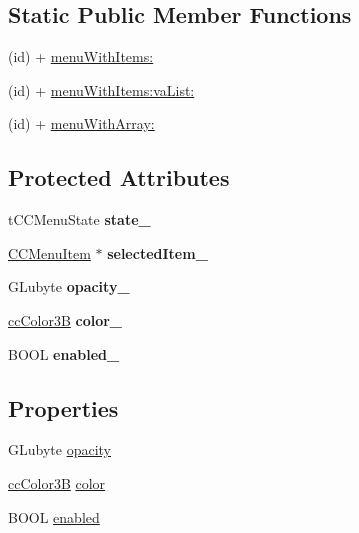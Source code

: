 \subsection*{Static Public Member Functions}
\begin{DoxyCompactItemize}
\item 
(id) + \hyperlink{interface_c_c_menu_aefcb167ba03050c94e2e31c4faa2e6cf}{menu\-With\-Items\-:}
\item 
(id) + \hyperlink{interface_c_c_menu_a06d3ce20a8986202652696d0d134256c}{menu\-With\-Items\-:va\-List\-:}
\item 
(id) + \hyperlink{interface_c_c_menu_a09ec48afb9919da68e3b56c43f83e70e}{menu\-With\-Array\-:}
\end{DoxyCompactItemize}
\subsection*{Protected Attributes}
\begin{DoxyCompactItemize}
\item 
\hypertarget{interface_c_c_menu_a51e3a5373db2db4c76be2d194a3557d8}{t\-C\-C\-Menu\-State {\bfseries state\-\_\-}}\label{interface_c_c_menu_a51e3a5373db2db4c76be2d194a3557d8}

\item 
\hypertarget{interface_c_c_menu_ae4ff16dc73f8bd8e87c06e48f7d5b711}{\hyperlink{interface_c_c_menu_item}{C\-C\-Menu\-Item} $\ast$ {\bfseries selected\-Item\-\_\-}}\label{interface_c_c_menu_ae4ff16dc73f8bd8e87c06e48f7d5b711}

\item 
\hypertarget{interface_c_c_menu_a3499f0d82ea4b07217c751751fcd7a6f}{G\-Lubyte {\bfseries opacity\-\_\-}}\label{interface_c_c_menu_a3499f0d82ea4b07217c751751fcd7a6f}

\item 
\hypertarget{interface_c_c_menu_a1e5390ec575da58041fdc3d7c7c85232}{\hyperlink{cc_types_8h_a829b00c53e72f0115e3880cb508fec1e}{cc\-Color3\-B} {\bfseries color\-\_\-}}\label{interface_c_c_menu_a1e5390ec575da58041fdc3d7c7c85232}

\item 
\hypertarget{interface_c_c_menu_a82e928d38fb2c2040a21d8113767bacc}{B\-O\-O\-L {\bfseries enabled\-\_\-}}\label{interface_c_c_menu_a82e928d38fb2c2040a21d8113767bacc}

\end{DoxyCompactItemize}
\subsection*{Properties}
\begin{DoxyCompactItemize}
\item 
G\-Lubyte \hyperlink{interface_c_c_menu_aa8e735d5821c296df27a9238325ec427}{opacity}
\item 
\hyperlink{cc_types_8h_a829b00c53e72f0115e3880cb508fec1e}{cc\-Color3\-B} \hyperlink{interface_c_c_menu_a49b749a8f0da9a6d377fb735301f7db8}{color}
\item 
B\-O\-O\-L \hyperlink{interface_c_c_menu_a5cd5e32ca21936168d1dcc704ca1a82f}{enabled}
\end{DoxyCompactItemize}


